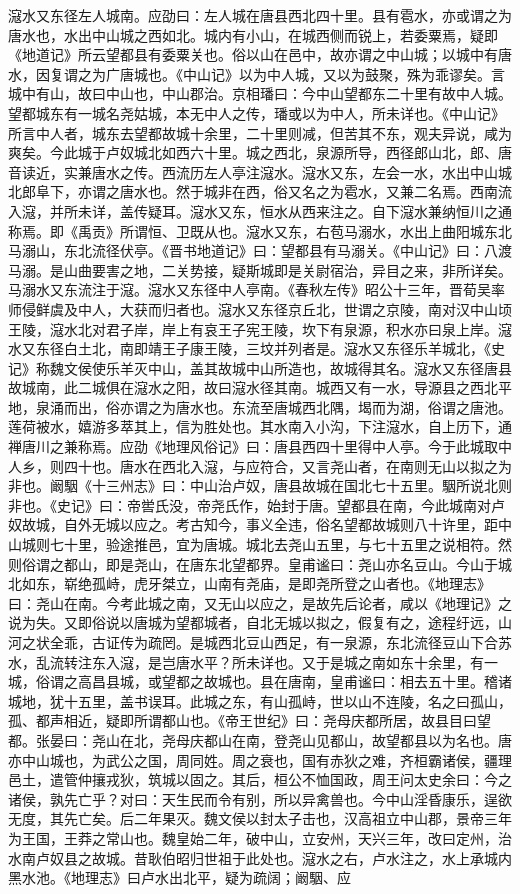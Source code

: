 \documentclass[12pt,UTF8]{ctexbook}
\begin{document}
滱水又东径左人城南。应劭曰：左人城在唐县西北四十里。县有雹水，亦或谓之为唐水也，水出中山城之西如北。城内有小山，在城西侧而锐上，若委粟焉，疑即《地道记》所云望都县有委粟关也。俗以山在邑中，故亦谓之中山城；以城中有唐水，因复谓之为广唐城也。《中山记》以为中人城，又以为鼓聚，殊为乖谬矣。言城中有山，故曰中山也，中山郡治。京相璠曰：今中山望都东二十里有故中人城。望都城东有一城名尧姑城，本无中人之传，璠或以为中人，所未详也。《中山记》所言中人者，城东去望都故城十余里，二十里则减，但苦其不东，观夫异说，咸为爽矣。今此城于卢奴城北如西六十里。城之西北，泉源所导，西径郎山北，郎、唐音读近，实兼唐水之传。西流历左人亭注滱水。滱水又东，左会一水，水出中山城北郎阜下，亦谓之唐水也。然于城非在西，俗又名之为雹水，又兼二名焉。西南流入滱，并所未详，盖传疑耳。滱水又东，恒水从西来注之。自下滱水兼纳恒川之通称焉。即《禹贡》所谓恒、卫既从也。滱水又东，右苞马溺水，水出上曲阳城东北马溺山，东北流径伏亭。《晋书地道记》曰：望都县有马溺关。《中山记》曰：八渡马溺。是山曲要害之地，二关势接，疑斯城即是关尉宿治，异目之来，非所详矣。马溺水又东流注于滱。滱水又东径中人亭南。《春秋左传》昭公十三年，晋荀吴率师侵鲜虞及中人，大获而归者也。滱水又东径京丘北，世谓之京陵，南对汉中山顷王陵，滱水北对君子岸，岸上有哀王子宪王陵，坎下有泉源，积水亦曰泉上岸。滱水又东径白土北，南即靖王子康王陵，三坟并列者是。滱水又东径乐羊城北，《史记》称魏文侯使乐羊灭中山，盖其故城中山所造也，故城得其名。滱水又东径唐县故城南，此二城俱在滱水之阳，故曰滱水径其南。城西又有一水，导源县之西北平地，泉涌而出，俗亦谓之为唐水也。东流至唐城西北隅，堨而为湖，俗谓之唐池。莲荷被水，嬉游多萃其上，信为胜处也。其水南入小沟，下注滱水，自上历下，通禅唐川之兼称焉。应劭《地理风俗记》曰：唐县西四十里得中人亭。今于此城取中人乡，则四十也。唐水在西北入滱，与应符合，又言尧山者，在南则无山以拟之为非也。阚駰《十三州志》曰：中山治卢奴，唐县故城在国北七十五里。駰所说北则非也。《史记》曰：帝喾氏没，帝尧氏作，始封于唐。望都县在南，今此城南对卢奴故城，自外无城以应之。考古知今，事义全违，俗名望都故城则八十许里，距中山城则七十里，验途推邑，宜为唐城。城北去尧山五里，与七十五里之说相符。然则俗谓之都山，即是尧山，在唐东北望都界。皇甫谧曰：尧山亦名豆山。今山于城北如东，崭绝孤峙，虎牙桀立，山南有尧庙，是即尧所登之山者也。《地理志》曰：尧山在南。今考此城之南，又无山以应之，是故先后论者，咸以《地理记》之说为失。又即俗说以唐城为望都城者，自北无城以拟之，假复有之，途程纡远，山河之状全乖，古证传为疏罔。是城西北豆山西足，有一泉源，东北流径豆山下合苏水，乱流转注东入滱，是岂唐水平？所未详也。又于是城之南如东十余里，有一城，俗谓之高昌县城，或望都之故城也。县在唐南，皇甫谧曰：相去五十里。稽诸城地，犹十五里，盖书误耳。此城之东，有山孤峙，世以山不连陵，名之曰孤山，孤、都声相近，疑即所谓都山也。《帝王世纪》曰：尧母庆都所居，故县目曰望都。张晏曰：尧山在北，尧母庆都山在南，登尧山见都山，故望都县以为名也。唐亦中山城也，为武公之国，周同姓。周之衰也，国有赤狄之难，齐桓霸诸侯，疆理邑土，遣管仲攘戎狄，筑城以固之。其后，桓公不恤国政，周王问太史余曰：今之诸侯，孰先亡乎？对曰：天生民而令有别，所以异禽兽也。今中山淫昏康乐，逞欲无度，其先亡矣。后二年果灭。魏文侯以封太子击也，汉高祖立中山郡，景帝三年为王国，王莽之常山也。魏皇始二年，破中山，立安州，天兴三年，改曰定州，治水南卢奴县之故城。昔耿伯昭归世祖于此处也。滱水之右，卢水注之，水上承城内黑水池。《地理志》曰卢水出北平，疑为疏阔；阚駰、应
\end{document}
